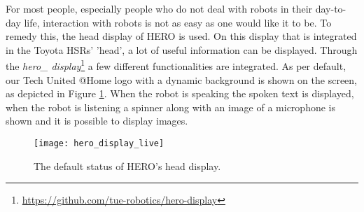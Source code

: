 \label{ssec:display}
For most people, especially people who do not deal with robots in their day-to-day life, interaction with robots is not as easy as one would like it to be.
To remedy this, the head display of HERO is used. On this display that is integrated in the Toyota HSRs' 'head', a lot of useful information can be displayed. Through the \emph{hero\_ display}\footnote{\url{https://github.com/tue-robotics/hero-display}} a few different functionalities are integrated. As per default, our Tech United @Home logo with a dynamic background is shown on the screen, as depicted in Figure \ref{fig:hero_display}. When the robot is speaking the spoken text is displayed, when the robot is listening a spinner along with an image of a microphone is shown and it is possible to display images.
\begin{figure}[H]
    \centering
	\texttt{[image: hero\_display\_live]}
	\caption{
		The default status of HERO's head display.}
	\label{fig:hero_display}
\end{figure}